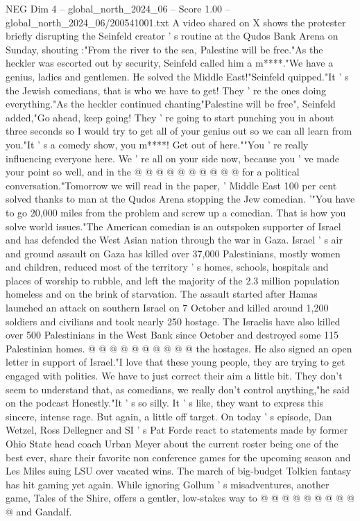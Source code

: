 \begin{textsample}{NEG Dim 4 – global\_north\_2024\_06 – Score 1.00 – global\_north\_2024\_06/200541001.txt}  \label{ex:f4_neg_318}
A video shared on X shows the protester briefly disrupting the Seinfeld creator ' s routine at the Qudos Bank Arena on Sunday, shouting :"From the river to the sea, Palestine will be free."As the heckler was escorted out by security, Seinfeld called him a m****."We have a genius, ladies and gentlemen.
He solved the Middle East!"Seinfeld quipped."It ' s the Jewish comedians, that is who we have to get!
They ' re the ones doing everything."As the heckler continued chanting"Palestine will be free", Seinfeld added,"Go ahead, keep going!
They ' re going to start punching you in about three seconds so I would try to get all of your genius out so we can all learn from you."It ' s a comedy show, you m****!
Get out of here.""You ' re really influencing everyone here.
We ' re all on your side now, because you ' ve made your point so well, and in the @ @ @ @ @ @ @ @ @ @ for a political conversation."Tomorrow we will read in the paper, ' Middle East 100 per cent solved thanks to man at the Qudos Arena stopping the Jew comedian. '"You have to go 20,000 miles from the problem and screw up a comedian.
That is how you solve world issues."The American comedian is an outspoken supporter of Israel and has defended the West Asian nation through the war in Gaza.
Israel ' s air and ground assault on Gaza has killed over 37,000 Palestinians, mostly women and children, reduced most of the territory ' s homes, schools, hospitals and places of worship to rubble, and left the majority of the 2.3 million population homeless and on the brink of starvation.
The assault started after Hamas launched an attack on southern Israel on 7 October and killed around 1,200 soldiers and civilians and took nearly 250 hostage.
The Israelis have also killed over 500 Palestinians in the West Bank since October and destroyed some 115 Palestinian homes. @ @ @ @ @ @ @ @ @ @ the hostages.
He also signed an open letter in support of Israel."I love that these young people, they are trying to get engaged with politics.
We have to just correct their aim a little bit.
They don't seem to understand that, as comedians, we really don't control anything,"he said on the podcast Honestly."It ' s so silly.
It ' s like, they want to express this sincere, intense rage.
But again, a little off target.
On today ' s episode, Dan Wetzel, Ross Dellegner and SI ' s Pat Forde react to statements made by former Ohio State head coach Urban Meyer about the current roster being one of the best ever, share their favorite non conference games for the upcoming season and Les Miles suing LSU over vacated wins.
The march of big-budget Tolkien fantasy has hit gaming yet again.
While ignoring Gollum ' s misadventures, another game, Tales of the Shire, offers a gentler, low-stakes way to @ @ @ @ @ @ @ @ @ @ and Gandalf.

\end{textsample}
